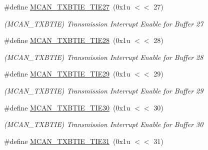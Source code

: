 \begin{DoxyCompactItemize}
\mbox{\label{group__SAME70__MCAN_ga68e9210bec0a8e220d27e82be1dead64}} 
\#define \mbox{\hyperlink{group__SAME70__MCAN_ga68e9210bec0a8e220d27e82be1dead64}{M\+C\+A\+N\+\_\+\+T\+X\+B\+T\+I\+E\+\_\+\+T\+I\+E27}}~(0x1u $<$$<$ 27)
\begin{DoxyCompactList}\small\item\em (M\+C\+A\+N\+\_\+\+T\+X\+B\+T\+IE) Transmission Interrupt Enable for Buffer 27 \end{DoxyCompactList}\item 
\mbox{\label{group__SAME70__MCAN_ga8485649a470b10c9aace069e365a2bab}} 
\#define \mbox{\hyperlink{group__SAME70__MCAN_ga8485649a470b10c9aace069e365a2bab}{M\+C\+A\+N\+\_\+\+T\+X\+B\+T\+I\+E\+\_\+\+T\+I\+E28}}~(0x1u $<$$<$ 28)
\begin{DoxyCompactList}\small\item\em (M\+C\+A\+N\+\_\+\+T\+X\+B\+T\+IE) Transmission Interrupt Enable for Buffer 28 \end{DoxyCompactList}\item 
\mbox{\label{group__SAME70__MCAN_gaa0eb59216e0f2638ea87bf9e48eee8cf}} 
\#define \mbox{\hyperlink{group__SAME70__MCAN_gaa0eb59216e0f2638ea87bf9e48eee8cf}{M\+C\+A\+N\+\_\+\+T\+X\+B\+T\+I\+E\+\_\+\+T\+I\+E29}}~(0x1u $<$$<$ 29)
\begin{DoxyCompactList}\small\item\em (M\+C\+A\+N\+\_\+\+T\+X\+B\+T\+IE) Transmission Interrupt Enable for Buffer 29 \end{DoxyCompactList}\item 
\mbox{\label{group__SAME70__MCAN_ga056ce90119731b98412a62489805ee63}} 
\#define \mbox{\hyperlink{group__SAME70__MCAN_ga056ce90119731b98412a62489805ee63}{M\+C\+A\+N\+\_\+\+T\+X\+B\+T\+I\+E\+\_\+\+T\+I\+E30}}~(0x1u $<$$<$ 30)
\begin{DoxyCompactList}\small\item\em (M\+C\+A\+N\+\_\+\+T\+X\+B\+T\+IE) Transmission Interrupt Enable for Buffer 30 \end{DoxyCompactList}\item 
\mbox{\label{group__SAME70__MCAN_gabb05fb8ddb784ce81ec71535c06c0fa6}} 
\#define \mbox{\hyperlink{group__SAME70__MCAN_gabb05fb8ddb784ce81ec71535c06c0fa6}{M\+C\+A\+N\+\_\+\+T\+X\+B\+T\+I\+E\+\_\+\+T\+I\+E31}}~(0x1u $<$$<$ 31)
$$
\end{DoxyCompactItemize}
